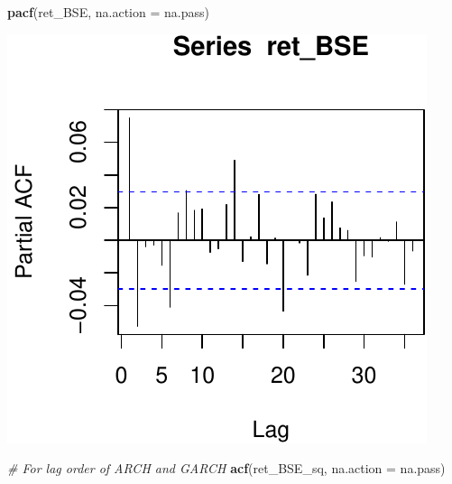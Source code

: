 \documentclass[11pt,]{article}
\newenvironment{Shaded}{\begin{snugshade}}{\end{snugshade}}
\newcommand{\KeywordTok}[1]{\textcolor[rgb]{0.13,0.29,0.53}{\textbf{#1}}}
\newcommand{\DataTypeTok}[1]{\textcolor[rgb]{0.13,0.29,0.53}{#1}}
\newcommand{\CommentTok}[1]{\textcolor[rgb]{0.56,0.35,0.01}{\textit{#1}}}
\newcommand{\NormalTok}[1]{#1}
\begin{document}
\begin{Shaded}
\begin{Highlighting}[]
\KeywordTok{pacf}\NormalTok{(ret_BSE, }\DataTypeTok{na.action =}\NormalTok{ na.pass)}
\end{Highlighting}
\end{Shaded}

\begin{center}\includegraphics{FMC_T4_PhD_ARMA_GARCH_files/figure-latex/BSE_fit_ARMA_GARCH_ACF-2} \end{center}

\begin{Shaded}
\begin{Highlighting}[]
\CommentTok{# For lag order of ARCH and GARCH}
\KeywordTok{acf}\NormalTok{(ret_BSE_sq, }\DataTypeTok{na.action =}\NormalTok{ na.pass)}
\end{Highlighting}
\end{Shaded}
\end{document}
